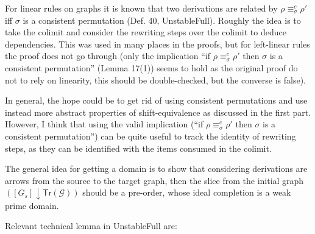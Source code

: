 \documentclass{llncs}
\newcommand{\slice}[2]{\ensuremath{({#1} \downarrow {#2})}}
\newcommand{\tr}[1]{\ensuremath{\mathsf{Tr}({#1})}}
\begin{document}
For linear rules on graphs it is known that two derivations are
related by $\rho \equiv^c_\sigma \rho'$ iff $\sigma$ is a consistent
permutation (Def. 40, UnstableFull). Roughly the idea is to take the colimit
and consider the rewriting steps over the colimit to deduce
dependencies. This was used in many places in the proofs, but for
left-linear rules the proof does not go through (only the implication
``if $\rho \equiv^c_\sigma \rho'$ then $\sigma$ is a consistent
permutation'' (Lemma 17(1)) seems to hold as the original proof do not
to rely on linearity, this should be double-checked, but the converse
is false).

In general, the hope could be to get rid of using consistent
permutations and use instead more abstract properties of
shift-equivalence as discussed in the first part. However, I think
that using the valid implication (``if $\rho \equiv^c_\sigma \rho'$
then $\sigma$ is a consistent permutation'') can be quite useful to track the identity of rewriting steps, as they can be identified with the items consumed in the colimit.

The general idea for getting a domain is to show that considering derivations are arrows from the source to the target graph, then the slice from the initial graph $\slice{[G_s]}{\tr{\mathcal{G}}}$ should be a pre-order, whose ideal completion is a weak prime domain.

Relevant technical lemma in UnstableFull are:
\end{document}
